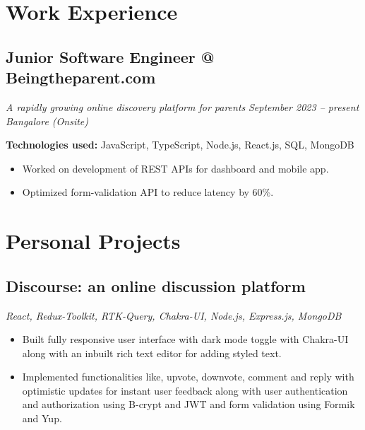 \documentclass[a4paper]{article}
\begin{document}
\section{Work Experience}
\subsection{Junior Software Engineer @ Beingtheparent.com}
\textit{A rapidly growing online discovery platform for parents}
\hfill
\textit{September 2023 -- present}
\textbar
\textit{ Bangalore (Onsite)}

\vspace{3pt}
\textbf{Technologies used:}
JavaScript, TypeScript, Node.js, React.js, SQL, MongoDB
\begin{itemize}
    \item Worked on development of REST APIs for dashboard and mobile app.
    \item Optimized form-validation API to reduce latency by 60\%.
\end{itemize}


\section{Personal Projects}
\subsection{Discourse: an online discussion platform}
\textit{React, Redux-Toolkit, RTK-Query, Chakra-UI, Node.js, Express.js, MongoDB}
\hfill
\href{https://discourse-app.netlify.app/}{ \faLink }
\textbar
\href{https://github.com/jatinkumar-me/Discourse}{ \faCode}
\begin{itemize}
    \item Built fully responsive user interface with dark mode toggle with Chakra-UI along with an inbuilt rich text editor for adding styled text.  
    \item Implemented functionalities like, upvote, downvote, comment and reply with optimistic updates for instant user feedback along with user authentication and authorization using B-crypt and JWT and form validation using Formik and Yup. 
\end{itemize}

\end{document}
